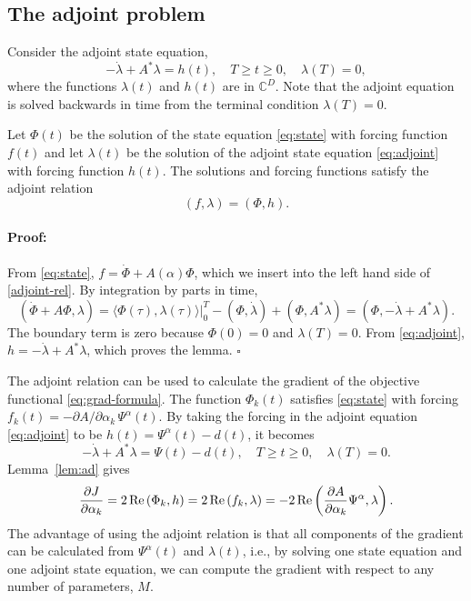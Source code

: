\documentclass[11pt]{article}
\begin{document}
\subsection{The adjoint problem}
Consider the adjoint state equation,
\begin{equation}\label{eq:adjoint}
  -\dot{\lambda} + A^* \lambda = h(t),\quad T\geq t \geq 0,\quad \lambda(T)=0,
\end{equation}
where the functions $\lambda(t)$ and $h(t)$ are in ${\mathbb
  C}^D$. Note that the adjoint equation is solved backwards in time
from the terminal condition $\lambda(T)=0$.
%
\begin{lemma}\label{lem:ad}
  Let $\Phi(t)$ be the solution of the state equation \eqref{eq:state} with forcing function $f(t)$
  and let $\lambda(t)$ be the solution of the adjoint state equation \eqref{eq:adjoint} with forcing
  function $h(t)$. The solutions and forcing functions satisfy the adjoint relation
  \begin{equation}\label{adjoint-rel}
    (f, \lambda) = (\Phi, h).
  \end{equation}
\end{lemma}
%
\paragraph{Proof:}
From \eqref{eq:state}, $f=\dot{\Phi} + A(\alpha) \Phi$, which we insert into the left hand side of
\eqref{adjoint-rel}. By integration by parts in time,
\[
( \dot{\Phi} + A \Phi, \lambda ) = \left.\langle \Phi(\tau), \lambda(\tau)
\rangle\right|_{0}^T -
%
( \Phi , \dot{\lambda} ) +  ( \Phi, A^* \lambda ) = (\Phi, - \dot{\lambda} +
A^* \lambda).
\]
The boundary term is zero because $\Phi(0)=0$ and $\lambda(T)=0$. From \eqref{eq:adjoint}, $h =
-\dot{\lambda} + A^* \lambda$, which proves the lemma. $\square$

The adjoint relation can be used to calculate the gradient of the objective functional
\eqref{eq:grad-formula}. The function $\Phi_k(t)$ satisfies \eqref{eq:state} with forcing $f_k(t) = -
\partial A/\partial \alpha_k\,\Psi^\alpha(t)$. By taking the forcing in the adjoint equation
\eqref{eq:adjoint} to be $h(t) = \Psi^\alpha(t)- d(t)$, it becomes
\begin{equation}\label{our-adjoint}
-\dot{\lambda} + A^* \lambda = \Psi(t)- d(t),\quad T\geq t \geq 0,\quad \lambda(T)=0.
\end{equation}
Lemma~\ref{lem:ad} gives
\[
\frac{\partial J}{\partial \alpha_k} = 2\, {\rm Re} \left( \Phi_k, h \right) =
%
2\, {\rm Re} \left( f_k, \lambda \right) =
%
-2\, {\rm Re} \left( \frac{\partial A}{\partial \alpha_k} \Psi^\alpha, \lambda \right).
\]
The advantage of using the adjoint relation is that all components of the gradient can be calculated
from $\Psi^\alpha(t)$ and $\lambda(t)$, i.e., by solving one state equation and one adjoint state
equation, we can compute the gradient with respect to any number of parameters, $M$.
\end{document}
